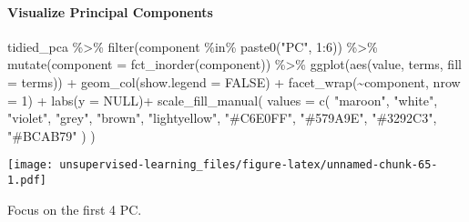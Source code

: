 \documentclass[
]{article}
\newenvironment{Shaded}{\begin{snugshade}}{\end{snugshade}}
\newcommand{\AttributeTok}[1]{\textcolor[rgb]{0.77,0.63,0.00}{#1}}
\newcommand{\ConstantTok}[1]{\textcolor[rgb]{0.00,0.00,0.00}{#1}}
\newcommand{\DecValTok}[1]{\textcolor[rgb]{0.00,0.00,0.81}{#1}}
\newcommand{\FunctionTok}[1]{\textcolor[rgb]{0.00,0.00,0.00}{#1}}
\newcommand{\NormalTok}[1]{#1}
\newcommand{\SpecialCharTok}[1]{\textcolor[rgb]{0.00,0.00,0.00}{#1}}
\newcommand{\StringTok}[1]{\textcolor[rgb]{0.31,0.60,0.02}{#1}}
\begin{document}
\hypertarget{visualize-principal-components}{%
\paragraph{Visualize Principal
Components}\label{visualize-principal-components}}

\begin{Shaded}
\begin{Highlighting}[]
\NormalTok{tidied\_pca }\SpecialCharTok{\%\textgreater{}\%}
  \FunctionTok{filter}\NormalTok{(component }\SpecialCharTok{\%in\%} \FunctionTok{paste0}\NormalTok{(}\StringTok{"PC"}\NormalTok{, }\DecValTok{1}\SpecialCharTok{:}\DecValTok{6}\NormalTok{)) }\SpecialCharTok{\%\textgreater{}\%}
  \FunctionTok{mutate}\NormalTok{(}\AttributeTok{component =} \FunctionTok{fct\_inorder}\NormalTok{(component)) }\SpecialCharTok{\%\textgreater{}\%}
  \FunctionTok{ggplot}\NormalTok{(}\FunctionTok{aes}\NormalTok{(value, terms, }\AttributeTok{fill =}\NormalTok{ terms)) }\SpecialCharTok{+}
  \FunctionTok{geom\_col}\NormalTok{(}\AttributeTok{show.legend =} \ConstantTok{FALSE}\NormalTok{) }\SpecialCharTok{+}
  \FunctionTok{facet\_wrap}\NormalTok{(}\SpecialCharTok{\textasciitilde{}}\NormalTok{component, }\AttributeTok{nrow =} \DecValTok{1}\NormalTok{) }\SpecialCharTok{+}
  \FunctionTok{labs}\NormalTok{(}\AttributeTok{y =} \ConstantTok{NULL}\NormalTok{)}\SpecialCharTok{+}
  \FunctionTok{scale\_fill\_manual}\NormalTok{(}
    \AttributeTok{values =} \FunctionTok{c}\NormalTok{(}
      \StringTok{"maroon"}\NormalTok{,}
      \StringTok{"white"}\NormalTok{,}
      \StringTok{"violet"}\NormalTok{,}
      \StringTok{"grey"}\NormalTok{,}
      \StringTok{"brown"}\NormalTok{,}
      \StringTok{"lightyellow"}\NormalTok{,}
      \StringTok{"\#C6E0FF"}\NormalTok{,}
      \StringTok{"\#579A9E"}\NormalTok{,}
      \StringTok{"\#3292C3"}\NormalTok{,}
      \StringTok{"\#BCAB79"}
\NormalTok{    )}
\NormalTok{  )}
\end{Highlighting}
\end{Shaded}

\texttt{[image: unsupervised-learning\_files/figure-latex/unnamed-chunk-65-1.pdf]}

Focus on the first 4 PC.
\end{document}
